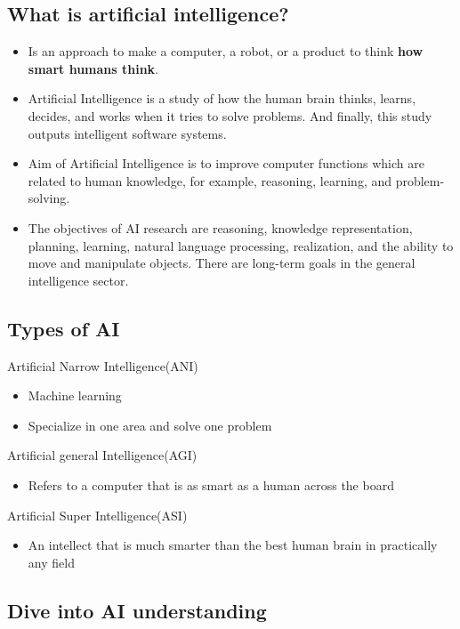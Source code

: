 \documentclass[a4paper, 12pt]{article}
\begin{document}
    \subsection{What is artificial intelligence?}
        \begin{itemize}
            \item Is an approach to make a computer, a robot, or a product to think \textbf{how smart humans think}.
            \item Artificial Intelligence is a study of how the human brain thinks, learns, decides, and works when it tries to solve problems. And finally, this study outputs intelligent software systems.
            \item Aim of Artificial Intelligence is to improve computer functions which are related to human knowledge, for example, reasoning, learning, and problem-solving.
            \item The objectives of AI research are reasoning, knowledge representation, planning, learning, natural language processing, realization, and the ability to move and manipulate objects. There are long-term goals in the general intelligence sector.
        \end{itemize}
    
    \subsection{Types of AI}
        Artificial Narrow Intelligence(ANI)
        \begin{itemize}
            \item Machine learning
            \item Specialize in one area and solve one problem
        \end{itemize}

        Artificial general Intelligence(AGI)
        \begin{itemize}
            \item Refers to a computer that is as smart as a human across the board
        \end{itemize}

        Artificial Super Intelligence(ASI)
        \begin{itemize}
            \item An intellect that is much smarter than the best human brain in practically any field
        \end{itemize}

    \subsection{Dive into AI understanding}
\end{document}
